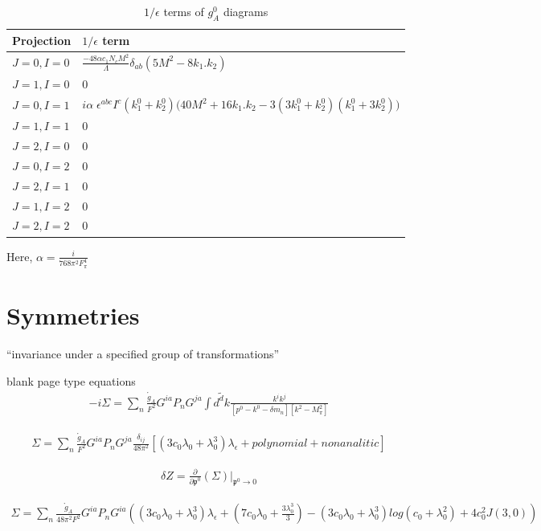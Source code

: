 \documentclass{article}
\newcommand{\bea}{\begin{eqnarray}}
\newcommand{\eea}{\end{eqnarray}}
\begin{document}
\bgroup
\def\arraystretch{2.5}%
\begin{table}
	[ht]
	\caption{$1/ \epsilon$ terms of $g_A^0$ diagrams}\label{table:gA4} 
	\begin{tabular}{ M{2.0cm} M{9.5cm}}
		\hline 
		Projection  & $1/ \epsilon$ term \\
		\hline 
		$J=0,I=0$ &  $ \frac{-48 \alpha c_1 N_c M^2}{\Lambda} \delta_{ab} (5M^2-8k_1.k_2)$  \\ 
		$J=1,I=0$ &  $ 0$  \\ 
		$J=0,I=1$ &  $ i\alpha\; \epsilon^{abc} I^c \left( k_1^0+k_2^0\right) \bigg( 40 M^2 +16 k_1.k_2 -3 (3k_1^0+k_2^0)(k_1^0+3k_2^0) \bigg) $  \\ 
		$J=1,I=1$ &  $  0 $\\
		$J=2,I=0$ &  $  0 $  \\ 
		$J=0,I=2$ &  $ 0 $  \\ 
		$J=2,I=1$ &  $  0 $  \\ 
		$J=1,I=2$ &  $  0 $  \\ 
		$J=2,I=2$ &  $  0 $  \\ 
		\hline
	\end{tabular}
\end{table}
\egroup

Here, $\alpha= \frac{ i}{768 \pi^2 F_\pi^4} $





\newpage
\section{Symmetries}

“invariance under a specified group of transformations”

\newpage
blank page
\newpage
type equations
\bea
-i\Sigma= \sum_{n}^{} \frac{\mathring{g}_A}{F^2} G^{ia} P_n G^{ja}  \int \tilde{d^dk} \frac{ k^i k^j  }{ \left[ p^0 -k^0 -\delta m_n \right] \left[k^2-M_\pi^2 \right] }
\eea

\bea
\Sigma= \sum_{n}^{} \frac{\mathring{g}_A}{F^2} G^{ia} P_n G^{ja} \frac{\delta_{ij}}{48\pi^2}  \left[(3c_0 \lambda_0 +\lambda_0^3)\lambda_\epsilon+ polynomial+nonanalitic \right]
\eea


\bea
\delta Z=  \frac{\partial}{ \partial \mathfrak{p^0}} \left( \Sigma \right) \bigg\rvert_{\mathfrak{p^0} \rightarrow 0  }
\eea

\bea
\Sigma= \sum_{n}^{} \frac{\mathring{g}_A}{48\pi^2F^2} G^{ia} P_n G^{ia} \left( (3c_0 \lambda_0 +\lambda_0^3)\lambda_\epsilon + \left( 7c_0\lambda_0 +\frac{3\lambda_0^3}{3}  \right) - (3c_0 \lambda_0 +\lambda_0^3) log(c_0+\lambda_0^2)+ 4c_0^2 J(3,0) \right)
\eea
\end{document}

